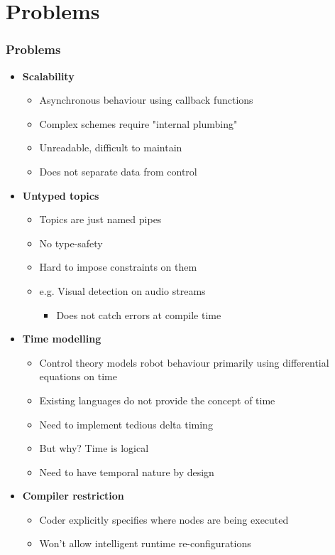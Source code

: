 \documentclass[hyperref={pdfpagelayout=SinglePage}]{beamer}
\begin{document}
\section{Problems}
	\begin{frame}[allowframebreaks] \frametitle{Problems}
		\begin{itemize}
		\item \textbf{Scalability}
			\begin{itemize}
			\item Asynchronous behaviour using callback functions
			\item Complex schemes require "internal plumbing"
			\item Unreadable, difficult to maintain
			\item Does not separate data from control
			\end{itemize}
		\item \textbf{Untyped topics}
			\begin{itemize}
			\item Topics are just named pipes
			\item No type-safety
			\item Hard to impose constraints on them
			\item e.g. Visual detection on audio streams
				\begin{itemize}
				\item Does not catch errors at compile time
				\end{itemize}
			\end{itemize}	
		\framebreak	
		\item \textbf{Time modelling}
			\begin{itemize}
			\item Control theory models robot behaviour primarily using differential equations on time
			\item Existing languages do not provide the concept of time
			\item Need to implement tedious delta timing
			\item But why? Time is logical
			\item Need to have temporal nature by design
			\end{itemize}
		\item \textbf{Compiler restriction}
			\begin{itemize}
			\item Coder explicitly specifies where nodes are being executed
			\item Won't allow intelligent runtime re-configurations 

\end{itemize}
\end{itemize}
\end{frame}
\end{document}
